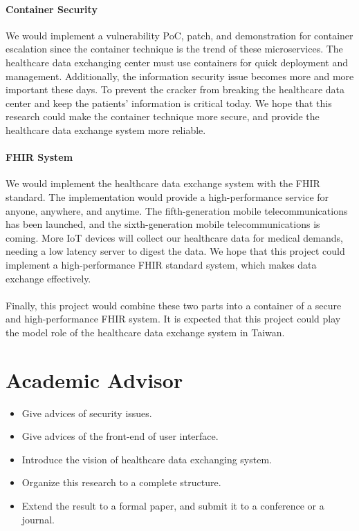 \documentclass[12pt,a4paper]{article}
\begin{document}
\paragraph{Container Security}
We would implement a vulnerability PoC, patch, and demonstration for container escalation
since the container technique is the trend of these microservices. The healthcare data
exchanging center must use containers for quick deployment and management. Additionally, the
information security issue becomes more and more important these days. To prevent the
cracker from breaking the healthcare data center and keep the patients' information is critical
today. We hope that this research could make the container technique more secure, and provide
the healthcare data exchange system more reliable.

\paragraph{FHIR System}
We would implement the healthcare data exchange system with the FHIR standard. The implementation
would provide a high-performance service for anyone, anywhere, and anytime. The fifth-generation
mobile telecommunications has been launched, and the sixth-generation mobile telecommunications is
coming.  More IoT devices will collect our healthcare data for medical demands, needing a low
latency server to digest the data. We hope that this project could implement a high-performance FHIR
standard system, which makes data exchange effectively.
\paragraph{}
Finally, this project would combine these two parts into a container of a secure and
high-performance FHIR system. It is expected that this project could play the model role of the
healthcare data exchange system in Taiwan.

\printbibliography[heading=bibnumbered]

\section{Academic Advisor}
\begin{itemize}
  \item Give advices of security issues.
  \item Give advices of the front-end of user interface.
  \item Introduce the vision of healthcare data exchanging system.
  \item Organize this research to a complete structure.
  \item Extend the result to a formal paper, and submit it to a conference or a journal.
\end{itemize}
\end{document}
